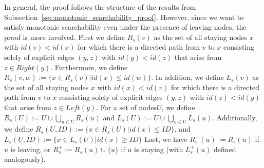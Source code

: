 \documentclass[a4paper,USenglish]{lipics}
\newcommand{\rsp}{\ensuremath{R_s^+}\xspace}
\newcommand{\lsp}{\ensuremath{L_s^+}\xspace}
\newcommand{\rsvw}{\ensuremath{R_s(v,w)}\xspace}
\begin{document}
In general, the proof follows the structure of the results from Subsection~\ref{sec:monotonic_searchability_proof}.
However, since we want to satisfy monotonic searchability even under the presence of leaving nodes, the proof is more involved.
First we define $R_s(v)$ as the set of all staying nodes $x$ with $id(v) < id(x)$ for which there is a directed path from $v$ to $x$ consisting solely of explicit edges $(y,z)$ with $id(y) < id(z)$ that arise from $z \in Right(y)$.
Furthermore, we define $\rsvw := \{x \in R_s(v) | id(x) \leq id(w)\}$.
In addition, we define $L_s(v)$ as the set of all staying nodes $x$ with $id(x) < id(v)$ for which there is a directed path from $v$ to $x$ consisting solely of explicit edges $(y,z)$ with $id(z) < id(y)$ that arise from $z \in Left(y)$.
For a set of nodes$U$, we define $R_s(U) := U \cup \bigcup_{u \in U}R_s(u)$ and $L_s(U) := U \cup \bigcup_{u \in U}L_s(u)$.
Additionally, we define $R_s(U,ID) := \{x \in R_s(U) | id(x) \leq ID\}$, and $L_s(U,ID) := \{x \in L_s(U) | id(x) \geq ID\}$
Last, we have $\rsp(u) := R_s(u)$ if $u$ is leaving, or $\rsp := R_s(u) \cup \{u\}$ if $u$ is staying (with $\lsp(u)$ defined analogously).
\end{document}

